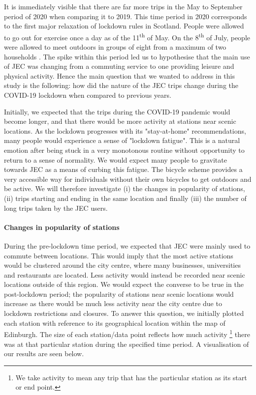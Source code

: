 \documentclass[11pt,a4paper]{article}
\begin{document}
It is immediately visible that there are far more trips in the May to September period of 2020 when comparing it to 2019. This time period in 2020 corresponds to the first major relaxation of lockdown rules in Scotland. People were allowed to go out for exercise once a day as of the 11\textsuperscript{th} of May. On the 8\textsuperscript{th} of July, people were allowed to meet outdoors in groups of eight from a maximum of two households \cite{timeline}. The spike within this period led us to hypothesise that the main use of JEC was changing from a commuting service to one providing leisure and physical activity. Hence the main question that we wanted to address in this study is the following: how did the nature of the JEC trips change during the COVID-19 lockdown when compared to previous years.
\par Initially, we expected that the trips during the COVID-19 pandemic would become longer, and that there would be more activity at stations near scenic locations. As the lockdown progresses with its "stay-at-home" recommendations, many people would experience a sense of "lockdown fatigue". This is a natural emotion after being stuck in a very monotonous routine without opportunity to return to a sense of normality. We would expect many people to gravitate towards JEC as a means of curbing this fatigue. The bicycle scheme provides a very accessible way for individuals without their own bicycles to get outdoors and be active. We will therefore investigate (i) the changes in popularity of stations, (ii) trips starting and ending in the same location and finally (iii) the number of long trips taken by the JEC users.

\paragraph{Changes in popularity of stations} During the pre-lockdown time period, we expected that JEC were mainly used to commute between locations. This would imply that the most active stations would be clustered around the city centre, where many businesses, universities and restaurants are located. Less activity would instead be recorded near scenic locations outside of this region. We would expect the converse to be true in the post-lockdown period; the popularity of stations near scenic locations would increase as there would be much less activity near the city centre due to lockdown restrictions and closures. To answer this question, we initially plotted each station with reference to its geographical location within the map of Edinburgh. The size of each station/data point reflects how much activity \footnote{We take activity to mean any trip that has the particular station as its start or end point.} there was at that particular station during the specified time period. A visualisation of our results are seen below.
\end{document}
